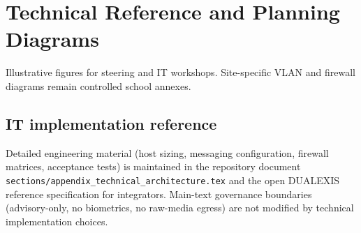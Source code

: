 \section{Technical Reference and Planning Diagrams}
\label{app:technical-diagrams}
\label{app:technical-architecture}

Illustrative figures for steering and IT workshops.
Site-specific VLAN and firewall diagrams remain controlled school annexes.




\subsection{IT implementation reference}

Detailed engineering material (host sizing, messaging configuration, firewall matrices,
acceptance tests) is maintained in the repository document
\texttt{sections/appendix\_technical\_architecture.tex} and the open DUALEXIS reference
specification for integrators.
Main-text governance boundaries (advisory-only, no biometrics, no raw-media egress) are not
modified by technical implementation choices.
